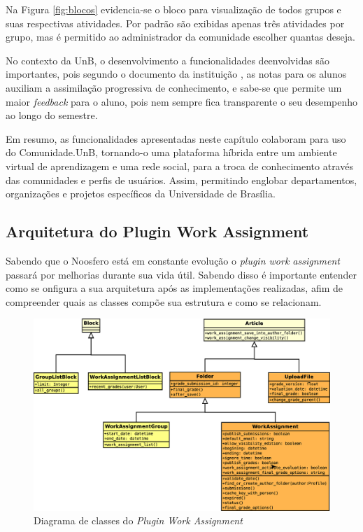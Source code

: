 Na Figura \ref{fig:blocos} evidencia-se o bloco para visualização de todos grupos e suas respectivas atividades. Por padrão são exibidas apenas três atividades por grupo, mas é permitido ao administrador da comunidade escolher quantas deseja.

No contexto da UnB, o desenvolvimento a funcionalidades deenvolvidas são importantes, pois segundo o documento da instituição , as notas para os alunos auxiliam a assimilação progressiva de conhecimento, e sabe-se que permite um maior \textit{feedback} para o aluno, pois nem sempre fica transparente o seu desempenho ao longo do semestre.

Em resumo, as funcionalidades apresentadas neste capítulo colaboram para uso do Comunidade.UnB, tornando-o uma plataforma híbrida entre um ambiente virtual de aprendizagem e uma rede social, para a troca de conhecimento através das comunidades e perfis de usuários. Assim, permitindo englobar departamentos, organizações e projetos específicos da Universidade de Brasília.

\subsection{Arquitetura do Plugin Work Assignment}

Sabendo que o Noosfero está em constante evolução o \textit{plugin work assignment} passará por melhorias durante sua vida útil. Sabendo disso é importante entender como se onfigura a sua arquitetura após as implementações realizadas, afim de compreender quais as classes compõe sua estrutura e como se relacionam.

\begin{figure}[h]
    \centering
    \includegraphics[keepaspectratio=true,scale=0.3]
      {figuras/diagramaUMLCompletoColor.eps}
    \caption{Diagrama de classes do \textit{Plugin Work Assignment}}
    \label{fig:arquitetura-work}
\end{figure}

